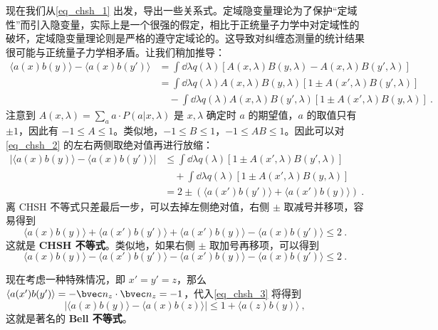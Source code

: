 现在我们从\autoref{eq_chsh_1} 出发，导出一些关系式。定域隐变量理论为了保护“定域性”而引入隐变量，实际上是一个很强的假定，相比于正统量子力学中对定域性的破坏，定域隐变量理论则是严格的遵守定域论的。这导致对纠缠态测量的统计结果很可能与正统量子力学相矛盾。让我们稍加推导：
\begin{equation}\label{eq_chsh_2}
\begin{aligned}
\langle a(x) b(y)\rangle - \langle a(x)b(y')\rangle &= \int \dd\lambda q(\lambda) [A(x,\lambda)B(y,\lambda)-A(x,\lambda)B(y',\lambda)]\\
&=\int \dd\lambda q(\lambda)A(x,\lambda)B(y,\lambda)[1\pm A(x',\lambda)B(y',\lambda)]\\&\quad -\int \dd\lambda q(\lambda)A(x,\lambda)B(y',\lambda)[1\pm A(x',\lambda)B(y,\lambda)]~.
\end{aligned}
\end{equation}
注意到 $A(x,\lambda)=\sum_a a\cdot P(a|x,\lambda)$ 是 $x,\lambda$ 确定时 $a$ 的期望值，$a$ 的取值只有 $\pm 1$，因此有 $-1\le A\le 1$。类似地，$-1\le B\le 1$，$-1\le AB\le 1$。因此可以对\autoref{eq_chsh_2} 的左右两侧取绝对值再进行放缩：
\begin{equation}\label{eq_chsh_3}
\begin{aligned}
|\langle a(x) b(y)\rangle - \langle a(x)b(y')\rangle|&\le \int \dd\lambda q(\lambda) [1\pm A(x',\lambda)B(y',\lambda)]\\
&\quad+\int \dd\lambda q(\lambda) [1\pm A(x',\lambda)B(y,\lambda)]\\
&=2 \pm (\langle a(x')b(y')\rangle+\langle a(x')b(y)\rangle)~.
\end{aligned}
\end{equation}
离 CHSH 不等式只差最后一步，可以去掉左侧绝对值，右侧 $\pm$ 取减号并移项，容易得到
\begin{equation}
\langle a(x) b(y)\rangle+
\langle a(x') b(y')\rangle+
\langle a(x') b(y)\rangle-
\langle a(x) b(y')\rangle\le 2~.
\end{equation}
这就是 \textbf{CHSH 不等式}。类似地，如果右侧 $\pm$ 取加号再移项，可以得到
\begin{equation}
\langle a(x) b(y)\rangle-
\langle a(x') b(y')\rangle-
\langle a(x') b(y)\rangle-
\langle a(x) b(y')\rangle\le 2~.
\end{equation}

现在考虑一种特殊情况，即 $x'=y'=z$，那么 $\langle a(x')b(y')\rangle = -\bvec n_z\cdot \bvec n_z=-1$，代入\autoref{eq_chsh_3} 将得到
\begin{equation}
|\langle a(x) b(y)\rangle - \langle a(x)b(z)\rangle|\le 1+\langle a(z)b(y)\rangle~,
\end{equation}
这就是著名的 \textbf{Bell 不等式}。
